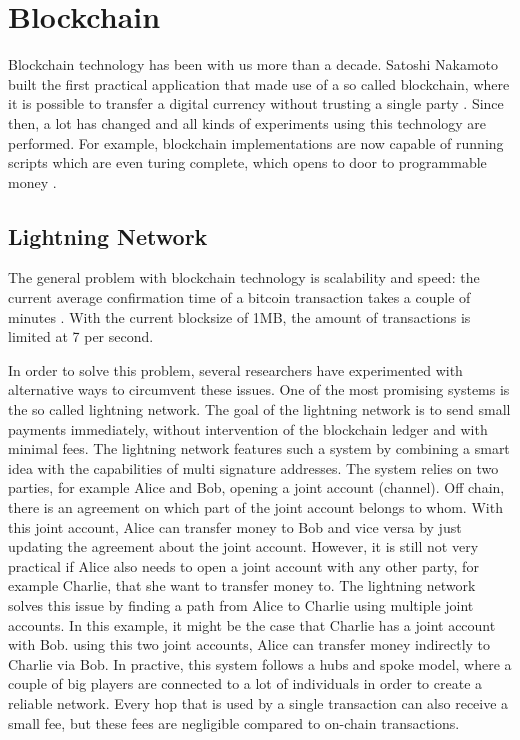 \section{Blockchain}

Blockchain technology has been with us more than a decade. Satoshi Nakamoto built the first practical application that made use of a so called blockchain, where it is possible to transfer a digital currency without trusting a single party \cite{nakamoto2019bitcoin}. Since then, a lot has changed and all kinds of experiments using this technology are performed. For example, blockchain implementations are now capable of running scripts which are even turing complete, which opens to door to programmable money \cite{wood2014ethereum}.


\subsection{Lightning Network}
The general problem with blockchain technology is scalability and speed: the current average confirmation time of a bitcoin transaction takes a couple of minutes \cite{bamert2013have}. With the current blocksize of 1MB, the amount of transactions is limited at 7 per second.

In order to solve this problem, several researchers have experimented with alternative ways to circumvent these issues. One of the most promising systems is the so called lightning network. The goal of the lightning network is to send small payments immediately, without intervention of the blockchain ledger and with minimal fees. The lightning network features such a system by combining a smart idea with the capabilities of multi signature addresses. The system relies on two parties, for example Alice and Bob, opening a joint account (channel). Off chain, there is an agreement on which part of the joint account belongs to whom. With this joint account, Alice can transfer money to Bob and vice versa by just updating the agreement about the joint account. However, it is still not very practical if Alice also needs to open a joint account with any other party, for example Charlie, that she want to transfer money to. The lightning network solves this issue by finding a path from Alice to Charlie using multiple joint accounts. In this example, it might be the case that Charlie has a joint account with Bob. using this two joint accounts, Alice can transfer money indirectly to Charlie via Bob. In practive, this system follows a hubs and spoke model, where a couple of big players are connected to a lot of individuals in order to create a reliable network. Every hop that is used by a single transaction can also receive a small fee, but these fees are negligible compared to on-chain transactions.


